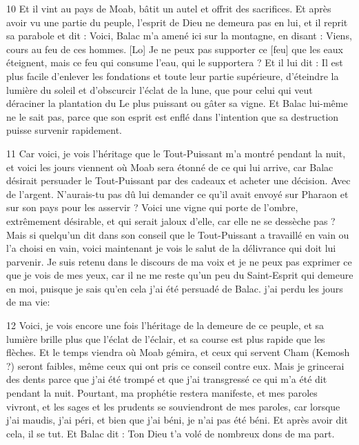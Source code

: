 \par 10 Et il vint au pays de Moab, bâtit un autel et offrit des sacrifices. Et après avoir vu une partie du peuple, l'esprit de Dieu ne demeura pas en lui, et il reprit sa parabole et dit : Voici, Balac m'a amené ici sur la montagne, en disant : Viens, cours au feu de ces hommes. [Lo] Je ne peux pas supporter ce [feu] que les eaux éteignent, mais ce feu qui consume l'eau, qui le supportera ? Et il lui dit : Il est plus facile d'enlever les fondations et toute leur partie supérieure, d'éteindre la lumière du soleil et d'obscurcir l'éclat de la lune, que pour celui qui veut déraciner la plantation du Le plus puissant ou gâter sa vigne. Et Balac lui-même ne le sait pas, parce que son esprit est enflé dans l'intention que sa destruction puisse survenir rapidement.

\par 11 Car voici, je vois l'héritage que le Tout-Puissant m'a montré pendant la nuit, et voici les jours viennent où Moab sera étonné de ce qui lui arrive, car Balac désirait persuader le Tout-Puissant par des cadeaux et acheter une décision. Avec de l'argent. N'aurais-tu pas dû lui demander ce qu'il avait envoyé sur Pharaon et sur son pays pour les asservir ? Voici une vigne qui porte de l'ombre, extrêmement désirable, et qui serait jaloux d'elle, car elle ne se dessèche pas ? Mais si quelqu'un dit dans son conseil que le Tout-Puissant a travaillé en vain ou l'a choisi en vain, voici maintenant je vois le salut de la délivrance qui doit lui parvenir. Je suis retenu dans le discours de ma voix et je ne peux pas exprimer ce que je vois de mes yeux, car il ne me reste qu'un peu du Saint-Esprit qui demeure en moi, puisque je sais qu'en cela j'ai été persuadé de Balac. j'ai perdu les jours de ma vie:

\par 12 Voici, je vois encore une fois l'héritage de la demeure de ce peuple, et sa lumière brille plus que l'éclat de l'éclair, et sa course est plus rapide que les flèches. Et le temps viendra où Moab gémira, et ceux qui servent Cham (Kemosh ?) seront faibles, même ceux qui ont pris ce conseil contre eux. Mais je grincerai des dents parce que j'ai été trompé et que j'ai transgressé ce qui m'a été dit pendant la nuit. Pourtant, ma prophétie restera manifeste, et mes paroles vivront, et les sages et les prudents se souviendront de mes paroles, car lorsque j'ai maudis, j'ai péri, et bien que j'ai béni, je n'ai pas été béni. Et après avoir dit cela, il se tut. Et Balac dit : Ton Dieu t'a volé de nombreux dons de ma part.

